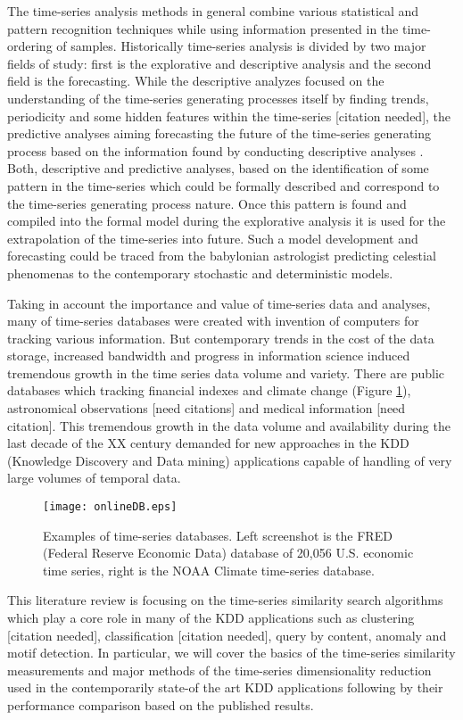 The time-series analysis methods in general combine various statistical and pattern recognition techniques while using information presented in the time-ordering of samples. Historically time-series analysis is divided by two major fields of study: first is the explorative and descriptive analysis and the second field is the forecasting. 
While the descriptive analyzes focused on the understanding of the time-series generating processes itself by finding trends, periodicity and some hidden features within the time-series [citation needed], the predictive analyses aiming forecasting the future of the time-series generating process based on the information found by conducting descriptive analyses \cite{citeulike:3449765}. 
Both, descriptive and predictive analyses, based on the identification of some pattern in the time-series which could be formally described and correspond to the time-series generating process nature. Once this pattern is found and compiled into the formal model during the explorative analysis it is used for the extrapolation of the time-series into future. Such a model development and forecasting could be traced from the babylonian astrologist predicting celestial phenomenas to the contemporary stochastic and deterministic models.

Taking in account the importance and value of time-series data and analyses, many of time-series databases were created with invention of computers for tracking various information. But contemporary trends in the cost of the data storage, increased bandwidth and progress in information science induced tremendous growth in the time series data volume and variety. There are public databases which tracking financial indexes and climate change (Figure \ref{fig:onlineDB}), astronomical observations [need citations] and medical information [need citation]. This tremendous growth in the data volume and availability during the last decade of the XX century demanded for new approaches in the KDD (Knowledge Discovery and Data mining) applications capable of handling of very large volumes of temporal data.
\begin{figure}[tbp]
   \centering
   \texttt{[image: onlineDB.eps]}
   \caption{Examples of time-series databases. Left screenshot is the FRED (Federal Reserve Economic Data) database of 20,056 U.S. economic time series, right is the NOAA Climate time-series database.}
   \label{fig:onlineDB}
\end{figure} 
This literature review is focusing on the time-series similarity search algorithms which play a core role in many of the KDD applications such as clustering [citation needed], classification [citation needed], query by content, anomaly and motif detection. In particular, we will cover the basics of the time-series similarity measurements and major methods of the time-series dimensionality reduction used in the contemporarily state-of the art KDD applications following by their performance comparison based on the published results.